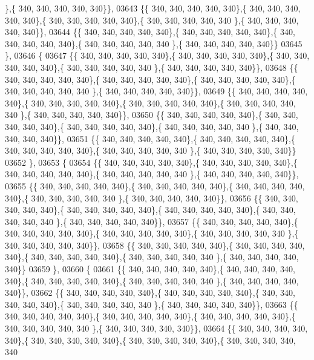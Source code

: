 \begin{DoxyCode}
      \},\{ 340, 340, 340, 340, 340\}\},
03643 \{\{ 340, 340, 340, 340, 340\},\{ 340, 340, 340, 340, 340\},\{ 340, 340, 340, 340, 340\},\{ 340, 340, 340, 340, 340
      \},\{ 340, 340, 340, 340, 340\}\},
03644 \{\{ 340, 340, 340, 340, 340\},\{ 340, 340, 340, 340, 340\},\{ 340, 340, 340, 340, 340\},\{ 340, 340, 340, 340, 340
      \},\{ 340, 340, 340, 340, 340\}\}
03645 \},
03646 \{
03647 \{\{ 340, 340, 340, 340, 340\},\{ 340, 340, 340, 340, 340\},\{ 340, 340, 340, 340, 340\},\{ 340, 340, 340, 340, 340
      \},\{ 340, 340, 340, 340, 340\}\},
03648 \{\{ 340, 340, 340, 340, 340\},\{ 340, 340, 340, 340, 340\},\{ 340, 340, 340, 340, 340\},\{ 340, 340, 340, 340, 340
      \},\{ 340, 340, 340, 340, 340\}\},
03649 \{\{ 340, 340, 340, 340, 340\},\{ 340, 340, 340, 340, 340\},\{ 340, 340, 340, 340, 340\},\{ 340, 340, 340, 340, 340
      \},\{ 340, 340, 340, 340, 340\}\},
03650 \{\{ 340, 340, 340, 340, 340\},\{ 340, 340, 340, 340, 340\},\{ 340, 340, 340, 340, 340\},\{ 340, 340, 340, 340, 340
      \},\{ 340, 340, 340, 340, 340\}\},
03651 \{\{ 340, 340, 340, 340, 340\},\{ 340, 340, 340, 340, 340\},\{ 340, 340, 340, 340, 340\},\{ 340, 340, 340, 340, 340
      \},\{ 340, 340, 340, 340, 340\}\}
03652 \},
03653 \{
03654 \{\{ 340, 340, 340, 340, 340\},\{ 340, 340, 340, 340, 340\},\{ 340, 340, 340, 340, 340\},\{ 340, 340, 340, 340, 340
      \},\{ 340, 340, 340, 340, 340\}\},
03655 \{\{ 340, 340, 340, 340, 340\},\{ 340, 340, 340, 340, 340\},\{ 340, 340, 340, 340, 340\},\{ 340, 340, 340, 340, 340
      \},\{ 340, 340, 340, 340, 340\}\},
03656 \{\{ 340, 340, 340, 340, 340\},\{ 340, 340, 340, 340, 340\},\{ 340, 340, 340, 340, 340\},\{ 340, 340, 340, 340, 340
      \},\{ 340, 340, 340, 340, 340\}\},
03657 \{\{ 340, 340, 340, 340, 340\},\{ 340, 340, 340, 340, 340\},\{ 340, 340, 340, 340, 340\},\{ 340, 340, 340, 340, 340
      \},\{ 340, 340, 340, 340, 340\}\},
03658 \{\{ 340, 340, 340, 340, 340\},\{ 340, 340, 340, 340, 340\},\{ 340, 340, 340, 340, 340\},\{ 340, 340, 340, 340, 340
      \},\{ 340, 340, 340, 340, 340\}\}
03659 \},
03660 \{
03661 \{\{ 340, 340, 340, 340, 340\},\{ 340, 340, 340, 340, 340\},\{ 340, 340, 340, 340, 340\},\{ 340, 340, 340, 340, 340
      \},\{ 340, 340, 340, 340, 340\}\},
03662 \{\{ 340, 340, 340, 340, 340\},\{ 340, 340, 340, 340, 340\},\{ 340, 340, 340, 340, 340\},\{ 340, 340, 340, 340, 340
      \},\{ 340, 340, 340, 340, 340\}\},
03663 \{\{ 340, 340, 340, 340, 340\},\{ 340, 340, 340, 340, 340\},\{ 340, 340, 340, 340, 340\},\{ 340, 340, 340, 340, 340
      \},\{ 340, 340, 340, 340, 340\}\},
03664 \{\{ 340, 340, 340, 340, 340\},\{ 340, 340, 340, 340, 340\},\{ 340, 340, 340, 340, 340\},\{ 340, 340, 340, 340, 340

\end{DoxyCode}
